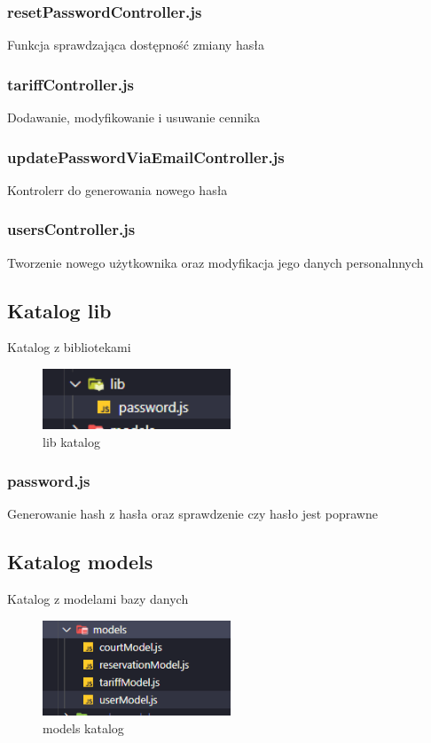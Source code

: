 \documentclass[titlepage]{article}
\begin{document}
\subsubsection{resetPasswordController.js}
Funkcja sprawdzająca dostępność zmiany hasła

\subsubsection{tariffController.js}
Dodawanie, modyfikowanie i usuwanie cennika

\subsubsection{updatePasswordViaEmailController.js}
Kontrolerr do generowania nowego hasła

\subsubsection{usersController.js}
Tworzenie nowego użytkownika oraz modyfikacja jego danych personalnnych

\newpage
\subsection{Katalog lib}
Katalog z bibliotekami

\begin{figure}[h]
\centering
\includegraphics[width=0.5\textwidth]{lib.png}
\caption{lib katalog}
\label{fig:obrazek lib}
\end{figure}

\subsubsection{password.js}
Generowanie hash z hasła oraz sprawdzenie czy hasło jest poprawne 

\subsection{Katalog models}
Katalog z modelami bazy danych

\begin{figure}[h]
\centering
\includegraphics[width=0.5\textwidth]{models.png}
\caption{models katalog}
\label{fig:obrazek models}
\end{figure}
\end{document}
